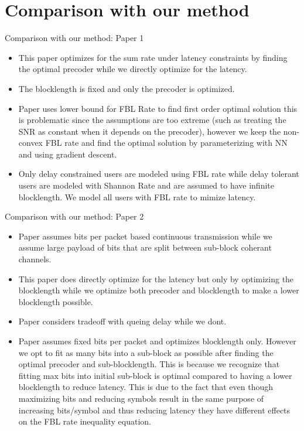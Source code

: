 \documentclass{beamer}
\begin{document}
\section{Comparison with our method}

\begin{frame}{Comparison with our method: Paper 1}
\begin{itemize}
    \item This paper optimizes for the sum rate under latency constraints by finding the optimal precoder while we directly optimize for the latency.
    \item The blocklength is fixed and only the precoder is optimized.
    \item Paper uses lower bound for FBL Rate to find first order optimal solution this is problematic since the assumptions are too extreme (such as treating the SNR as constant when it depends on the precoder), however we keep the non-convex FBL rate and find the optimal solution by parameterizing with NN and using gradient descent.
    \item Only delay constrained users are modeled using FBL rate while delay tolerant users are modeled with Shannon Rate and are assumed to have infinite blocklength. We model all users with FBL rate to mimize latency.
\end{itemize}

\end{frame}

\begin{frame}{Comparison with our method: Paper 2}
\begin{itemize}
    \item Paper assumes bits per packet based continuous transmission while we assume large payload of bits that are split between sub-block coherant channels.
    \item This paper does directly optimize for the latency but only by optimizing the blocklength while we optimize both precoder and blocklength to make a lower blocklength possible.
    \item Paper considers tradeoff with queing delay while we dont.
    \item Paper assumes fixed bits per packet and optimizes blocklength only.
    However we opt to fit as many bits into a sub-block as possible after finding the optimal precoder and sub-blocklength.
    This is because we recognize that fitting max bits into initial sub-block is optimal compared to having a lower blocklength to reduce latency.
    This is due to the fact that even though maximizing bits and reducing symbols result in the same purpose of increasing bits/symbol and thus reducing latency they have different effects on the FBL rate inequality equation.
\end{itemize}

\end{frame}
\end{document}
